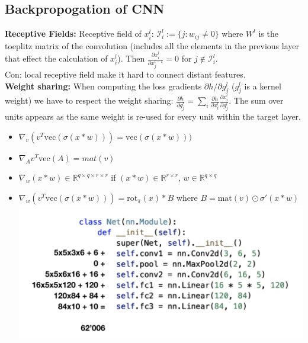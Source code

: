 \subsection{Backpropogation of CNN}
\textbf{Receptive Fields:} Receptive field of $x_i^l$: $\mathcal{I}_i^l := \{j: w_{ij} \neq 0\}$ where $W^l$ is the toeplitz matrix of the convolution (includes all the elements in the previous layer that effect the calculation of $x_i^l$). Then $\frac{\partial x_i^l}{\partial x_j^{l-1}} = 0$ for $j\notin \mathcal{I}_i^l$.\\
Con: local receptive field make it hard to connect distant features.\\ 
\textbf{Weight sharing: }When computing the loss gradients $\partial h/\partial g_j^l$ ($g_j^l$ is a kernel weight) we have to respect the weight sharing: $\frac{\partial h}{\partial g_j^l} = \sum_i \frac{\partial h}{\partial x_i^l}\frac{\partial x_i^l}{\partial g_j^l}$. The sum over units appears as the same weight is re-used for every unit within the target layer.
\begin{itemize}
    \item $\nabla_v (v^T \text{vec}(\sigma(x*w))) = \text{vec}(\sigma(x*w)))$
    \item $\nabla_A v^T \text{vec}(A) = mat(v)$
    \item $\nabla_w (x*w) \in \mathbb{R}^{q\times q \times r \times r}$ if $(x*w) \in \mathbb{R}^{r\times r}$, $w \in \mathbb{R}^{q\times q}$
    \item $\nabla_w(v^T \text{vec}(\sigma(x*w))) = \text{rot}_{\pi}(x) * B$ where $B = \text{mat}(v)\odot \sigma'(x*w)$\\
    \includegraphics[scale = 0.2]{contents/imgs/n_params_conv.png}
\end{itemize}
